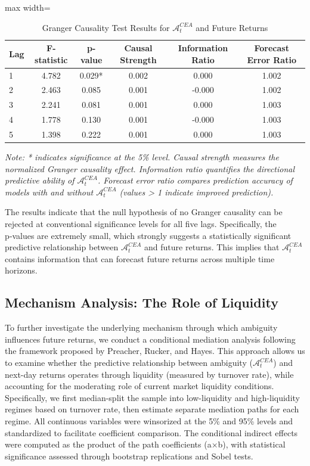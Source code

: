 \documentclass[preprint,12pt,authoryear]{elsarticle}
\begin{document}
\begin{table}[h!]
\centering
\caption{Granger Causality Test Results for \(\mathcal{A}^{CEA}_t\) and Future Returns}
\label{tab:granger}
\begin{adjustbox}{max width=\linewidth}
\begin{tabular}{l c c c c c}
\toprule
\textbf{Lag} & \textbf{F-statistic} & \textbf{p-value} & \textbf{Causal Strength} & \textbf{Information Ratio} & \textbf{Forecast Error Ratio} \\
\midrule
1 & 4.782 & 0.029* & 0.002 & 0.000 & 1.002 \\
2 & 2.463 & 0.085 & 0.001 & -0.000 & 1.002 \\
3 & 2.241 & 0.081 & 0.001 & 0.000 & 1.003 \\
4 & 1.778 & 0.130 & 0.001 & -0.000 & 1.003 \\
5 & 1.398 & 0.222 & 0.001 & 0.000 & 1.003 \\
\bottomrule
\end{tabular}
\end{adjustbox}
\vspace{0.1cm}
\raggedright\footnotesize{\textit{Note: * indicates significance at the 5\% level. Causal strength measures the normalized Granger causality effect. Information ratio quantifies the directional predictive ability of \(\mathcal{A}^{CEA}_t\). Forecast error ratio compares prediction accuracy of models with and without \(\mathcal{A}^{CEA}_t\) (values > 1 indicate improved prediction).}}
\end{table}

The results indicate that the null hypothesis of no Granger causality can be rejected at conventional significance levels for all five lags. Specifically, the p‑values are extremely small, which strongly suggests a statistically significant predictive relationship between $ \mathcal{A}^{CEA}_t $ and future returns. This implies that $ \mathcal{A}^{CEA}_t $ contains information that can forecast future returns across multiple time horizons.

\subsection{Mechanism Analysis: The Role of Liquidity}
To further investigate the underlying mechanism through which ambiguity influences future returns, we conduct a conditional mediation analysis following the framework proposed by Preacher, Rucker, and Hayes\cite{preacher2007moderated}. This approach allows us to examine whether the predictive relationship between ambiguity ($\mathcal{A}^{CEA}_t$) and next-day returns operates through liquidity (measured by turnover rate), while accounting for the moderating role of current market liquidity conditions. Specifically, we first median-split the sample into low-liquidity and high-liquidity regimes based on turnover rate, then estimate separate mediation paths for each regime. All continuous variables were winsorized at the 5\% and 95\% levels and standardized to facilitate coefficient comparison. The conditional indirect effects were computed as the product of the path coefficients (a×b), with statistical significance assessed through bootstrap replications and Sobel tests.
\end{document}
